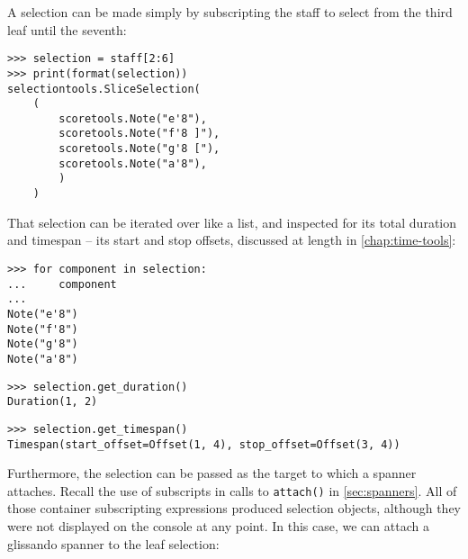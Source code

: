 \noindent A selection can be made simply by subscripting the staff to select
from the third leaf until the seventh:

\begin{comment}
<abjad>
selection = staff[2:6]
print(format(selection))
</abjad>
\end{comment}

\begin{abjadbookoutput}
\begin{singlespacing}
\vspace{-0.5\baselineskip}
\begin{verbatim}
>>> selection = staff[2:6]
>>> print(format(selection))
selectiontools.SliceSelection(
    (
        scoretools.Note("e'8"),
        scoretools.Note("f'8 ]"),
        scoretools.Note("g'8 ["),
        scoretools.Note("a'8"),
        )
    )
\end{verbatim}
\end{singlespacing}
\end{abjadbookoutput}

\noindent That selection can be iterated over like a list, and inspected for
its total duration and timespan -- its start and stop offsets, discussed at
length in \autoref{chap:time-tools}:

\begin{comment}
<abjad>
for component in selection:
    component

selection.get_duration()
selection.get_timespan()
</abjad>
\end{comment}

\begin{abjadbookoutput}
\begin{singlespacing}
\vspace{-0.5\baselineskip}
\begin{verbatim}
>>> for component in selection:
...     component
...
Note("e'8")
Note("f'8")
Note("g'8")
Note("a'8")
\end{verbatim}
\begin{verbatim}
>>> selection.get_duration()
Duration(1, 2)
\end{verbatim}
\begin{verbatim}
>>> selection.get_timespan()
Timespan(start_offset=Offset(1, 4), stop_offset=Offset(3, 4))
\end{verbatim}
\end{singlespacing}
\end{abjadbookoutput}

\noindent Furthermore, the selection can be passed as the target to which a
spanner attaches. Recall the use of subscripts in calls to \texttt{attach()} in
\autoref{sec:spanners}. All of those container subscripting expressions
produced selection objects, although they were not displayed on the console at
any point. In this case, we can attach a glissando spanner to the leaf
selection:

